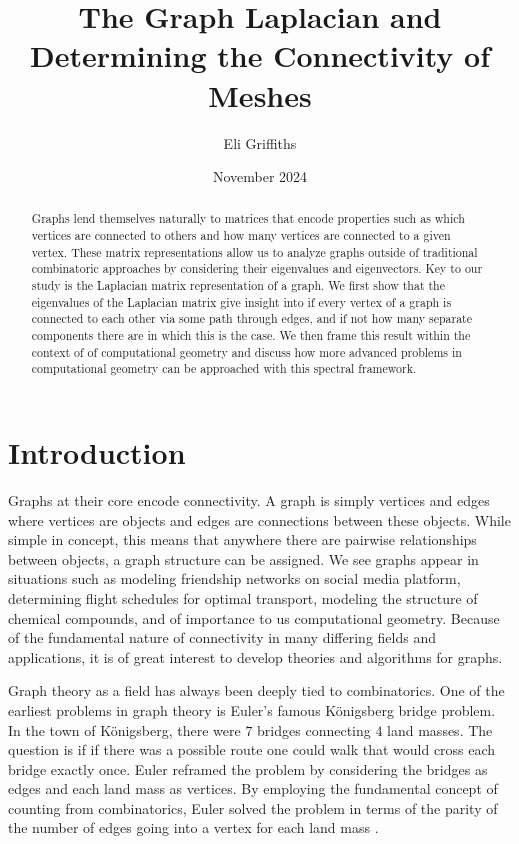 \documentclass[11pt]{article}
\title{The Graph Laplacian and Determining the Connectivity of Meshes}
\author{Eli Griffiths}
\date{November 2024}
\begin{document}
\maketitle

\begin{abstract}
    Graphs lend themselves naturally to matrices that encode properties such as which vertices are connected to others and how many vertices are connected to a given vertex. These matrix representations allow us to analyze graphs outside of traditional combinatoric approaches by considering their eigenvalues and eigenvectors. Key to our study is the Laplacian matrix representation of a graph. We first show that the eigenvalues of the Laplacian matrix give insight into if every vertex of a graph is connected to each other via some path through edges, and if not how many separate components there are in which this is the case. We then frame this result within the context of of computational geometry and discuss how more advanced problems in computational geometry can be approached with this spectral framework.
\end{abstract}

\section{Introduction}

Graphs at their core encode connectivity. A graph is simply vertices and edges where vertices are objects and edges are connections between these objects. While simple in concept, this means that anywhere there are pairwise relationships between objects, a graph structure can be assigned. We see graphs appear in situations such as modeling friendship networks on social media platform, determining flight schedules for optimal transport, modeling the structure of chemical compounds, and of importance to us computational geometry. Because of the fundamental nature of connectivity in many differing fields and applications, it is of great interest to develop theories and algorithms for graphs.

Graph theory as a field has always been deeply tied to combinatorics. One of the earliest problems in graph theory is Euler's famous K\"onigsberg bridge problem. In the town of K\"onigsberg, there were $7$ bridges connecting $4$ land masses. The question is if if there was a possible route one could walk that would cross each bridge exactly once. Euler reframed the problem by considering the bridges as edges and each land mass as vertices. By employing the fundamental concept of counting from combinatorics, Euler solved the problem in terms of the parity of the number of edges going into a vertex for each land mass \cite{wilson2013combinatorics}. %
\end{document}
